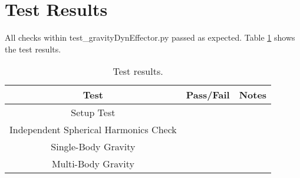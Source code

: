 \section{Test Results}

All checks within test\_gravityDynEffector.py passed as expected. Table \ref{tab:results} shows the test results.\\

\begin{table}[htbp]
	\caption{Test results.}
	\label{tab:results}
	\centering \fontsize{10}{10}\selectfont
	\begin{tabular}{c | c | c  } %
		\hline
		\textbf{Test} 				    & \textbf{Pass/Fail} 						   			           & \textbf{Notes} 									\\ \hline
		Setup Test       			  	&      & 			 \\ \hline
		Independent Spherical Harmonics Check  &                  &  \\ \hline
		Single-Body Gravity		   	&                  &  \\ \hline
		Multi-Body Gravity			 &  			 	 &   			   \\ \hline
	\end{tabular}
\end{table}